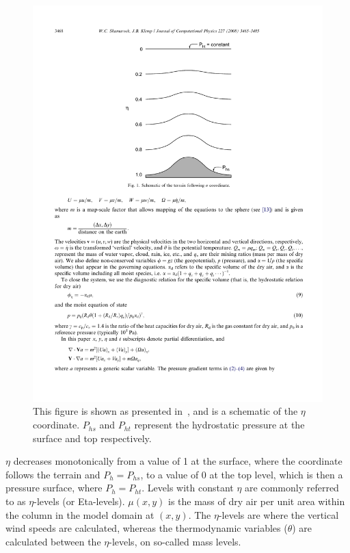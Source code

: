 \begin{figure}[ht]
\centering
\includegraphics[scale=0.9]{model_methods/sigma.pdf}
\caption{This figure is shown as presented in~\citet{Skamarock2008}, and is a schematic of the $\eta$ coordinate. $P_{hs}$ and $P_{ht}$ represent the hydrostatic pressure at the surface and top respectively.}
\label{fig:sigma}
\end{figure}

$\eta$ decreases monotonically from a value of 1 at the surface, where the coordinate follows the terrain and $P_h = P_{hs}$, to a value of 0 at the top level, which is then a pressure surface, where $P_h = P_{ht}$. Levels with constant $\eta$ are commonly referred to as $\eta$-levels (or Eta-levels). $\mu(x,y)$ is the mass of dry air per unit area within the column in the model domain at $(x,y)$. The $\eta$-levels are where the vertical wind speeds are calculated, whereas the thermodynamic variables ($\theta$) are calculated between the $\eta$-levels, on so-called mass levels.

